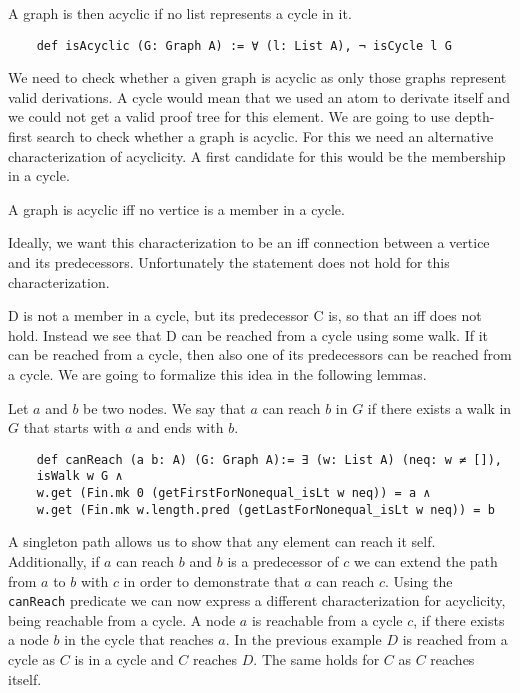 A graph is then acyclic if no list represents a cycle in it.

\begin{lstlisting}
    def isAcyclic (G: Graph A) := ∀ (l: List A), ¬ isCycle l G
\end{lstlisting}

We need to check whether a given graph is acyclic as only those graphs represent valid derivations. A cycle would mean that we used an atom to derivate itself and we could not get a valid proof tree for this element. We are going to use depth-first search to check whether a graph is acyclic. For this we need an alternative characterization of acyclicity.
A first candidate for this would be the membership in a cycle.

\begin{lemma}
    A graph is acyclic iff no vertice is a member in a cycle.
\end{lemma}

Ideally, we want this characterization to be an iff connection between a vertice and its predecessors. Unfortunately the statement does not hold for this characterization.


D is not a member in a cycle, but its predecessor C is, so that an iff does not hold. Instead we see that D can be reached from a cycle using some walk. If it can be reached from a cycle, then also one of its predecessors can be reached from a cycle. We are going to formalize this idea in the following lemmas.

Let $a$ and $b$ be two nodes. We say that $a$ can reach $b$ in $G$ if there exists a walk in $G$ that starts with $a$ and ends with $b$.

\begin{lstlisting}
    def canReach (a b: A) (G: Graph A):= ∃ (w: List A) (neq: w ≠ []),
    isWalk w G ∧
    w.get (Fin.mk 0 (getFirstForNonequal_isLt w neq)) = a ∧
    w.get (Fin.mk w.length.pred (getLastForNonequal_isLt w neq)) = b
\end{lstlisting}

A singleton path allows us to show that any element can reach it self. Additionally, if $a$ can reach $b$ and $b$ is a predecessor of $c$ we can extend the path from $a$ to $b$ with $c$ in order to demonstrate that $a$ can reach $c$. Using the \texttt{canReach} predicate we can now express a different characterization for acyclicity, being reachable from a cycle. A node $a$ is reachable from a cycle $c$, if there exists a node $b$ in the cycle that reaches $a$. In the previous example $D$ is reached from a cycle as $C$ is in a cycle and $C$ reaches $D$. The same holds for $C$ as $C$ reaches itself.

